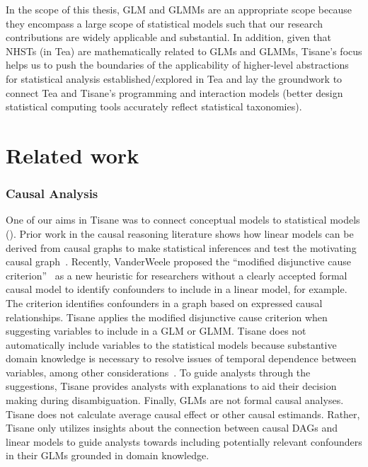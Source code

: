 In the scope of this thesis, GLM and GLMMs are an appropriate scope because they
encompass a large scope of statistical models such that our research
contributions are widely applicable and substantial. In addition, given that
NHSTs (in Tea) are mathematically related to GLMs and GLMMs, Tisane's focus
helps us to push the boundaries of the applicability of higher-level
abstractions for statistical analysis established/explored in Tea and lay the
groundwork to connect Tea and Tisane's programming and interaction models
(better design statistical computing tools accurately reflect statistical
taxonomies).

\section{Related work}
\subsubsection{Causal Analysis}
One of our aims in Tisane was to connect conceptual models to statistical models
(\connectConceptualStats). Prior work in the causal reasoning literature shows
how linear models can be derived from causal graphs to make statistical
inferences and test the motivating causal
graph~\cite{spirtes1996using,spirtes1994conditional}. Recently, VanderWeele
proposed the ``modified disjunctive cause
criterion''~\cite{vanderweele2019modifiedDisjunctiveCriterion} as a new
heuristic for researchers without a clearly accepted formal causal model to
identify confounders to include in a linear model, for example. The criterion
identifies confounders in a graph based on expressed causal relationships.
Tisane applies the modified disjunctive cause criterion when suggesting
variables to include in a GLM or GLMM. Tisane does not automatically include
variables to the statistical models because substantive domain knowledge is
necessary to resolve issues of temporal dependence between variables, among
other considerations~\cite{vanderweele2019modifiedDisjunctiveCriterion}. To
guide analysts through the suggestions, Tisane provides analysts with
explanations to aid their decision making during disambiguation. Finally, GLMs
are not formal causal analyses. Tisane does not calculate average causal effect
or other causal estimands. Rather, Tisane only utilizes insights about the
connection between causal DAGs and linear models to guide analysts towards
including potentially relevant confounders in their GLMs grounded in domain
knowledge. 


